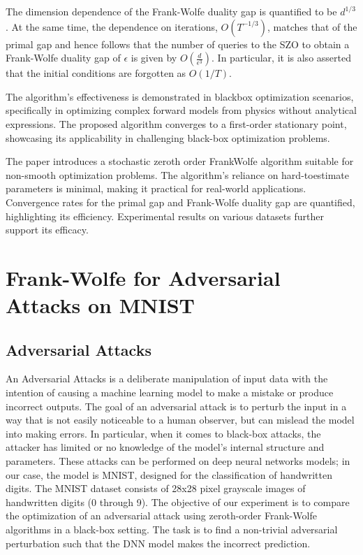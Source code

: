 \documentclass[10pt,twocolumn,letterpaper]{article}
\begin{document}
The dimension dependence of the Frank-Wolfe duality gap is quantified to be $d^{1 / 3}$.
At the same time, the dependence on iterations, $O\left(T^{-1 / 3}\right)$, matches
that of the primal gap and hence follows that the number of queries to the SZO to obtain a Frank-Wolfe 
duality gap of $\epsilon$ is given by $O\left(\frac{d}{\epsilon^{3}}\right)$. 
In particular, it is also asserted that the initial conditions 
are forgotten as $O(1 / T)$.

The algorithm's effectiveness is demonstrated in blackbox 
optimization scenarios, specifically in optimizing complex 
forward models from physics without analytical expressions. 
The proposed algorithm converges to a first-order stationary 
point, showcasing its applicability in challenging black-box 
optimization problems.

The paper introduces a stochastic zeroth order FrankWolfe 
algorithm suitable for non-smooth optimization problems. 
The algorithm's reliance on hard-toestimate parameters is
minimal, making it practical for real-world applications. 
Convergence rates for the primal gap and Frank-Wolfe duality 
gap are quantified, highlighting its efficiency. 
Experimental results on various datasets further support its efficacy.


\section{Frank-Wolfe for Adversarial Attacks on MNIST}

\subsection{Adversarial Attacks}

An Adversarial Attacks is a deliberate manipulation of input data with the 
intention of causing a machine learning model to make a mistake or produce 
incorrect outputs. The goal of an adversarial attack is to perturb 
the input in a way that is not easily noticeable to a human observer,
but can mislead the model into making errors. In particular, when it comes
to black-box attacks, the attacker has limited or no knowledge of the 
model's internal structure and parameters. These attacks can be performed on
deep neural networks models; in our case, the model is MNIST, designed for the
classification of handwritten digits. 
The MNIST dataset consists of 28x28 pixel grayscale images of handwritten digits (0 through 9).
The objective of our experiment is to compare the optimization of an adversarial attack using
zeroth-order Frank-Wolfe algorithms in a black-box setting.
The task is to find a non-trivial adversarial perturbation such that the DNN model
makes the incorrect prediction.
\end{document}
